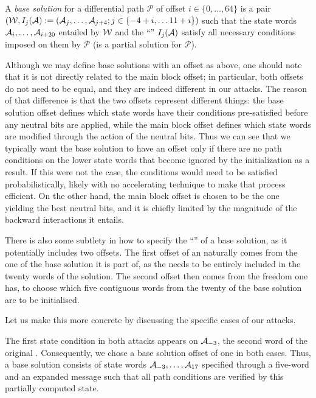 \begin{defi}
A \emph{base solution} for a differential path $\mathcal{P}$ of offset $i \in \{0,\ldots,64\}$ is a pair
$(\mathcal{W},  I_j(\mathcal{A}) := (\mathcal{A}_{j},\ldots,\mathcal{A}_{j+4}; j \in \{-4 + i,\ldots 11 + i\})$
such that the state words $\mathcal{A}_i, \ldots, \mathcal{A}_{i+20}$ entailed by $\mathcal{W}$ and the ``\iv'' $I_j(\mathcal{A})$ satisfy all necessary conditions imposed on them by $\mathcal{P}$ (\ie is a partial solution for $\mathcal{P}$).
\end{defi}

Although we may define base solutions with an offset as above, one should note that it is not directly related to the main block offset; in particular, both offsets do not need to be equal, and they
are indeed different in our attacks. The reason of that difference is that the two offsets represent different things: the base solution offset defines which state words have their conditions pre-satisfied
before any neutral bits are applied, while the main block offset defines which state words are modified through the action of the neutral bits. Thus we can see that we typically want the base solution
to have an offset only if there are no path conditions on the lower state words that become ignored by the initialization as a result. If this were not the case, the conditions would need to be
satisfied probabilistically, likely with no accelerating technique to make that process efficient. On the other hand, the main block offset is chosen to be the one yielding the best neutral bits, and
it is chiefly limited by the magnitude of the backward interactions it entails.

There is also some subtlety in how to specify the ``\iv'' of a base solution, as it potentially includes two offsets. The first offset of an \iv
naturally comes from the one of the base solution it is part of, as the \iv needs to be entirely included in the twenty words of the solution. The
second offset then comes from the freedom one has, to choose which five contiguous words from the twenty of the base solution are to be initialised.

Let us make this more concrete by discussing the specific cases of our attacks.

\medskip

The first state condition in both attacks appears on $\mathcal{A}_{-3}$, \ie the second word of the original \iv.
Consequently, we chose a base solution offset of one in both cases. 
Thus, a base solution consists of state words $\mathcal{A}_{-3},\ldots,\mathcal{A}_{17}$ specified through a five-word \iv and an expanded message such that all path conditions are verified by
this partially computed state.

